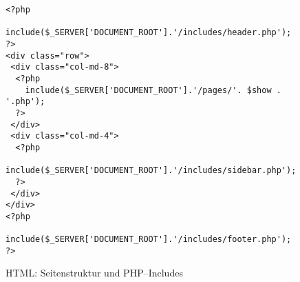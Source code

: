 \begin{figure}[h]
\begin{verbatim}
<?php 
  include($_SERVER['DOCUMENT_ROOT'].'/includes/header.php'); 
?>
<div class="row">
 <div class="col-md-8">
  <?php 
    include($_SERVER['DOCUMENT_ROOT'].'/pages/'. $show . '.php'); 
  ?> 
 </div>
 <div class="col-md-4">
  <?php 
    include($_SERVER['DOCUMENT_ROOT'].'/includes/sidebar.php'); 
  ?>
 </div>	  
</div>
<?php 
  include($_SERVER['DOCUMENT_ROOT'].'/includes/footer.php'); 
?>
\end{verbatim}
\caption{HTML: Seitenstruktur und PHP--Includes}
\label{fig:struktur}
\end{figure}
